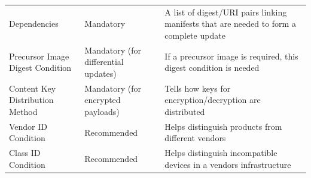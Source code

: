 \documentclass[0-thesis.tex]{subfiles}
\begin{document}
\begin{longtable}[]{@{}lll@{}}
\begin{minipage}[t]{0.23\columnwidth}
    Dependencies\strut
    \end{minipage} & \begin{minipage}[t]{0.26\columnwidth}\raggedright\strut
    Mandatory\strut
    \end{minipage} & \begin{minipage}[t]{0.42\columnwidth}\raggedright\strut
    A list of digest/URI pairs linking manifests that are needed to form a
    complete update\strut
    \end{minipage}\tabularnewline
    \begin{minipage}[t]{0.23\columnwidth}\raggedright\strut
    Precursor Image Digest Condition\strut
    \end{minipage} & \begin{minipage}[t]{0.26\columnwidth}\raggedright\strut
    Mandatory (for differential updates)\strut
    \end{minipage} & \begin{minipage}[t]{0.42\columnwidth}\raggedright\strut
    If a precursor image is required, this digest condition is needed\strut
    \end{minipage}\tabularnewline
    \begin{minipage}[t]{0.23\columnwidth}\raggedright\strut
    Content Key Distribution Method\strut
    \end{minipage} & \begin{minipage}[t]{0.26\columnwidth}\raggedright\strut
    Mandatory (for encrypted payloads)\strut
    \end{minipage} & \begin{minipage}[t]{0.42\columnwidth}\raggedright\strut
    Tells how keys for encryption/decryption are distributed\strut
    \end{minipage}\tabularnewline
    \begin{minipage}[t]{0.23\columnwidth}\raggedright\strut
    Vendor ID Condition\strut
    \end{minipage} & \begin{minipage}[t]{0.26\columnwidth}\raggedright\strut
    Recommended\strut
    \end{minipage} & \begin{minipage}[t]{0.42\columnwidth}\raggedright\strut
    Helps distinguish products from different vendors\strut
    \end{minipage}\tabularnewline
    \begin{minipage}[t]{0.23\columnwidth}\raggedright\strut
    Class ID Condition\strut
    \end{minipage} & \begin{minipage}[t]{0.26\columnwidth}\raggedright\strut
    Recommended\strut
    \end{minipage} & \begin{minipage}[t]{0.42\columnwidth}\raggedright\strut
    Helps distinguish incompatible devices in a vendors infrastructure\strut
    \end{minipage}\tabularnewline
    \bottomrule
\end{longtable}
\end{document}
